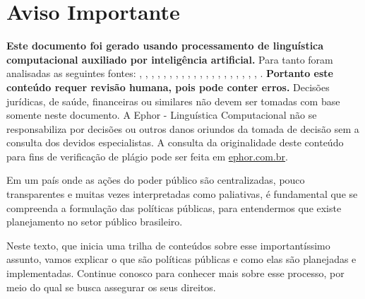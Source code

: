\documentclass[
   article,       
   12pt,          
   oneside,       
   a4paper,       
   english,       
   brazil,        
   sumario=tradicional
   ]{abntex2}
\begin{document}
\frenchspacing 
\maketitle

\textual
\section{Aviso Importante}
\textbf{Este documento foi gerado usando processamento de linguística computacional auxiliado por inteligência artificial.} Para tanto foram analisadas as seguintes fontes:  \cite{A_CAUSA_E_AS_POLITICAS_DE_DIREITOS_HUMANOS_NO}, \cite{Ciclo_de_Politicas_Publicas_por_que_e_importa}, \cite{Conheca_o_ciclo_das_politicas_publicas__Polit}, \cite{Educacao_Inclusiva_Conheca_o_historico_da_leg}, \cite{Entendendo_a_Tipologia_de_Politicas_Publicas_}, \cite{Escola_Nacional_de_Administracao_Publica__Wik}, \cite{Especialista_em_politicas_publicas_e_gestao_g}, \cite{FEDERALISMO_E_POLITICAS_PUBLICAS_NO_BRASIL_Ho}, \cite{Ministerio_do_Planejamento_e_Orcamento__Wikip}, \cite{Ministro_defende_que_direitos_humanos_precisa}, \cite{Politica_conceito_politicas_publicas_e_partid}, \cite{Politica_publica__o_que_e_tipos_de_politicas_}, \cite{Politica_publica__Wikipedia_a_enciclopedia_li}, \cite{Politicas_publicas__Wikipedia_la_enciclopedia}, \cite{Politicas_Publicas_entenda_o_que_sao_para_que}, \cite{Politicas_Publicas_o_que_sao_e_para_que_serve}, \cite{Politicas_publicas_o_que_sao_e_para_que_serve}, \cite{Politicas_publicas_o_que_sao_quem_faz_e_tipos}, \cite{Politicas_publicas_o_que_sao_tipos_e_exemplos}, \cite{Revista_USP_119__Dossie_1_Democracia_e_politi}, \cite{TCU_Ciclo_das_politicas_publicas__Tudo_o_que_}.
\textbf{Portanto este conteúdo requer revisão humana, pois pode conter erros.} Decisões jurídicas, de saúde, financeiras ou similares não devem ser tomadas com base somente neste documento. A Ephor - Linguística Computacional não se responsabiliza por decisões ou outros danos oriundos da tomada de decisão sem a consulta dos devidos especialistas.
A consulta da originalidade deste conteúdo para fins de verificação de plágio pode ser feita em \href{http://www.ephor.com.br}{ephor.com.br}.

Em um país onde as ações do poder público são centralizadas, pouco transparentes e muitas vezes interpretadas como paliativas, é fundamental que se compreenda a formulação das políticas públicas, para entendermos que existe planejamento no setor público brasileiro.

Neste texto, que inicia uma trilha de conteúdos sobre esse importantíssimo assunto, vamos explicar o que são políticas públicas e como elas são planejadas e implementadas. Continue conosco para conhecer mais sobre esse processo, por meio do qual se busca assegurar os seus direitos.
\end{document}
